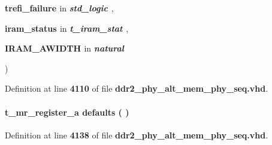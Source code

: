 {\begin{DoxyParamCaption}
\item[{}]{{\bfseries \textcolor{vhdlchar}{trefi\+\_\+failure}\textcolor{vhdlchar}{ }}\textcolor{stringliteral}{in} {\em {\bfseries \textcolor{vhdlchar}{ }\textcolor{comment}{std\+\_\+logic}\textcolor{vhdlchar}{ }\textcolor{vhdlchar}{ }\textcolor{vhdlchar}{ }}} , }
\item[{}]{{\bfseries \textcolor{vhdlchar}{iram\+\_\+status}\textcolor{vhdlchar}{ }}\textcolor{stringliteral}{in} {\em {\bfseries \textcolor{vhdlchar}{ }\textcolor{vhdlchar}{t\+\_\+iram\+\_\+stat}\textcolor{vhdlchar}{ }\textcolor{vhdlchar}{ }\textcolor{vhdlchar}{ }}} , }
\item[{}]{{\bfseries \textcolor{vhdlchar}{I\+R\+A\+M\+\_\+\+A\+W\+I\+D\+TH}\textcolor{vhdlchar}{ }}\textcolor{stringliteral}{in} {\em {\bfseries \textcolor{vhdlchar}{ }\textcolor{comment}{natural}\textcolor{vhdlchar}{ }\textcolor{vhdlchar}{ }\textcolor{vhdlchar}{ }}}}
\end{DoxyParamCaption}
)\hspace{0.3cm}{\ttfamily [Function]}}\label{class__ddr2__phy__alt__mem__phy__regs__pkg_a321020ab63ce3138bca259297c33f4a1}


Definition at line {\bf 4110} of file {\bf ddr2\+\_\+phy\+\_\+alt\+\_\+mem\+\_\+phy\+\_\+seq.\+vhd}.

\paragraph[{defaults}]{\setlength{\rightskip}{0pt plus 5cm} {\bfseries \textcolor{vhdlchar}{t\+\_\+mr\+\_\+register\+\_\+a}\textcolor{vhdlchar}{ }} defaults ( ) \hspace{0.3cm}{\ttfamily [Function]}}\label{class__ddr2__phy__alt__mem__phy__regs__pkg_adf2773c248ff0f40461632b86cad3053}


Definition at line {\bf 4138} of file {\bf ddr2\+\_\+phy\+\_\+alt\+\_\+mem\+\_\+phy\+\_\+seq.\+vhd}.

